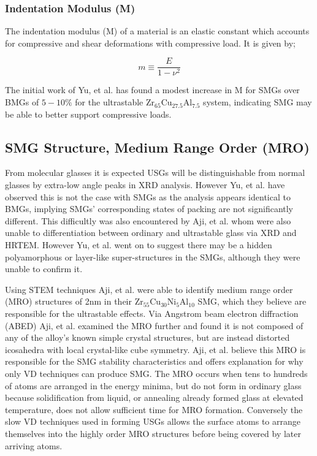 \documentclass[draft,a4paper,12pt,oneside]{report}%
\begin{document}
\subsubsection{Indentation Modulus (M)}
The indentation modulus (M) of a material is an elastic constant which accounts for compressive and shear deformations with compressive load. It is given by;

\begin{equation}
m \equiv 
\frac{E}
{1-\nu^{2}}
\label{equ:IndentModulus}
\end{equation}

The initial work of Yu, et al. \cite{Yu2013} has found a modest increase in M for SMGs over BMGs of $5- 10\%$ for the ultrastable Zr$_{65}$Cu$_{27.5}$Al$_{7.5}$ system, indicating SMG may be able to better support compressive loads.

\subsection{SMG Structure, Medium Range Order (MRO)}
From molecular glasses it is expected USGs will be distinguishable from normal glasses by extra-low angle peaks in XRD analysis. However Yu, et al. \cite{Yu2013} have observed this is not the case with SMGs as the analysis appears identical to BMGs, implying SMGs' corresponding states of packing are not significantly different. This difficultly was also encountered by Aji, et al. \cite{Aji2013} whom were also unable to differentiation between ordinary and ultrastable glass via XRD and HRTEM. However Yu, et al. \cite{Yu2013} went on to suggest there may be a hidden polyamorphous or layer-like super-structures in the SMGs, although they were unable to confirm it. 

Using STEM techniques Aji, et al. \cite{Aji2013} were able to identify medium range order (MRO) structures of 2nm in their Zr$_{55}$Cu$_{30}$Ni$_{5}$Al$_{10}$ SMG, which they believe are responsible for the ultrastable effects. Via Angstrom beam electron diffraction (ABED) Aji, et al. \cite{Aji2013} examined the MRO further and found it is not composed of any of the alloy's known simple crystal structures, but are instead distorted icosahedra with local crystal-like cube symmetry. Aji, et al. \cite{Aji2013} believe this MRO is responsible for the SMG stability characteristics and offers explanation for why only VD techniques can produce SMG. The MRO occurs when tens to hundreds of atoms are arranged in the energy minima, but do not form in ordinary glass because solidification from liquid, or annealing already formed glass at elevated temperature, does not allow sufficient time for MRO formation. Conversely the slow VD techniques used in forming USGs allows the surface atoms to arrange themselves into the highly order MRO structures before being covered by later arriving atoms.
\end{document}
